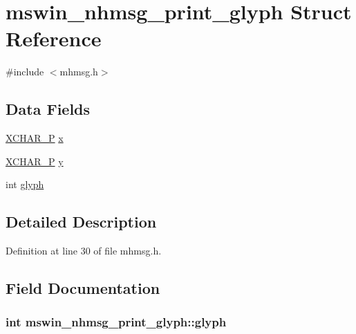 \hypertarget{structmswin__nhmsg__print__glyph}{\section{mswin\+\_\+nhmsg\+\_\+print\+\_\+glyph Struct Reference}
\label{structmswin__nhmsg__print__glyph}
}


{\ttfamily \#include $<$mhmsg.\+h$>$}

\subsection*{Data Fields}
\begin{DoxyCompactItemize}
\item 
\hyperlink{wingem1_8c_abea04566e20888dd08f477de5f4b9289}{X\+C\+H\+A\+R\+\_\+\+P} \hyperlink{structmswin__nhmsg__print__glyph_a78882344ead9571272a05592dd30142b}{x}
\item 
\hyperlink{wingem1_8c_abea04566e20888dd08f477de5f4b9289}{X\+C\+H\+A\+R\+\_\+\+P} \hyperlink{structmswin__nhmsg__print__glyph_a50e05842f25a1ae67f16ecba99cd0def}{y}
\item 
int \hyperlink{structmswin__nhmsg__print__glyph_a2abfc84b5f4e679af1923281cde0f809}{glyph}
\end{DoxyCompactItemize}


\subsection{Detailed Description}


Definition at line 30 of file mhmsg.\+h.



\subsection{Field Documentation}
\hypertarget{structmswin__nhmsg__print__glyph_a2abfc84b5f4e679af1923281cde0f809}{
\subsubsection[{glyph}]{\setlength{\rightskip}{0pt plus 5cm}int mswin\+\_\+nhmsg\+\_\+print\+\_\+glyph\+::glyph}}\label{structmswin__nhmsg__print__glyph_a2abfc84b5f4e679af1923281cde0f809}


